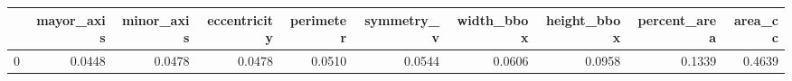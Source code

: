 \begin{tabular}{lrrrrrrrrr}
\toprule
 & mayor_axis & minor_axis & eccentricity & perimeter & symmetry_v & width_bbox & height_bbox & percent_area & area_cc \\
\midrule
0 & 0.0448 & 0.0478 & 0.0478 & 0.0510 & 0.0544 & 0.0606 & 0.0958 & 0.1339 & 0.4639 \\
\bottomrule
\end{tabular}
